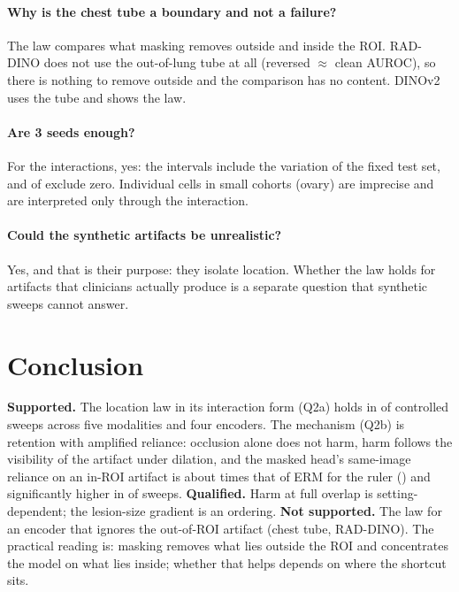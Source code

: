\paragraph{Why is the chest tube a boundary and not a failure?} The law compares what masking removes outside and
inside the ROI. RAD-DINO does not use the out-of-lung tube at all (reversed $\approx$ clean AUROC), so there is nothing to
remove outside and the comparison has no content. DINOv2 uses the tube and shows the law.
\paragraph{Are 3 seeds enough?} For the interactions, yes: the intervals include the variation of the fixed test set,
and \sTwoNInterPos{} of \sTwoNSweeps{} exclude zero. Individual cells in small cohorts (ovary) are imprecise and are
interpreted only through the interaction.
\paragraph{Could the synthetic artifacts be unrealistic?} Yes, and that is their purpose: they isolate location.
Whether the law holds for artifacts that clinicians actually produce is a separate question that synthetic sweeps
cannot answer.

\section{Conclusion}
\textbf{Supported.} The location law in its interaction form (Q2a) holds in \sTwoNInterPos{} of \sTwoNSweeps{}
controlled sweeps across five modalities and four encoders. The mechanism (Q2b) is retention with amplified reliance:
occlusion alone does not harm, harm follows the visibility of the artifact under dilation, and the masked head's
same-image reliance on an in-ROI artifact is about \sTwoDpRatioFull{} times that of ERM for the ruler (\sTwoDpDiffFull)
and significantly higher in \sTwoCfNPos{} of \sTwoCfN{} sweeps. \textbf{Qualified.} Harm at full overlap is
setting-dependent; the lesion-size gradient is an ordering. \textbf{Not supported.} The law for an encoder that ignores
the out-of-ROI artifact (chest tube, RAD-DINO). The practical reading is: masking removes what lies outside the ROI and
concentrates the model on what lies inside; whether that helps depends on where the shortcut sits.

